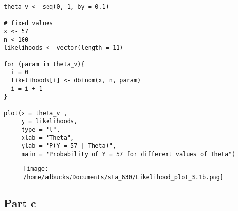 \documentclass[12pt, letterpaper]{article}
\begin{document}
\begin{verbatim}
theta_v <- seq(0, 1, by = 0.1) 

# fixed values 
x <- 57 
n < 100 
likelihoods <- vector(length = 11) 

for (param in theta_v){
  i = 0 
  likelihoods[i] <- dbinom(x, n, param) 
  i = i + 1 
}

plot(x = theta_v , 
     y = likelihoods, 
     type = "l", 
     xlab = "Theta", 
     ylab = "P(Y = 57 | Theta)", 
     main = "Probability of Y = 57 for different values of Theta")
\end{verbatim}

\begin{figure}
\texttt{[image: /home/adbucks/Documents/sta\_630/Likelihood\_plot\_3.1b.png]}
\end{figure}

\subsection{Part c} 
\end{document}
